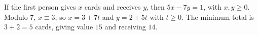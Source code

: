 If the first person gives $x$ cards and receives $y$, then $5x-7y=1$, with $x,y\ge0$. Modulo $7$, $x\equiv3$, so $x=3+7t$ and $y=2+5t$ with $t\ge0$. The minimum total is $3+2=\boxed5$ cards, giving value $15$ and receiving $14$.
